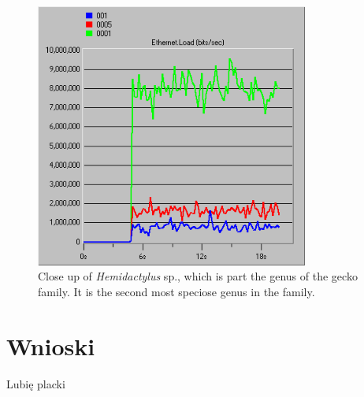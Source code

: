 \documentclass{article}
\begin{document}
\begin{figure}[ht]
  \centering
  \includegraphics[width=0.8\textwidth]{screens/samo/load.png}
 \caption[Close up of \textit{Hemidactylus} sp.]
   {Close up of \textit{Hemidactylus} sp., which is
   part the genus of the gecko family. It is the
   second most speciose genus in the family.}
 \label{fig:example}
\end{figure}

\section{Wnioski}


Lubię placki
\end{document}
